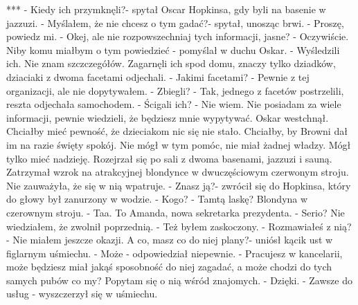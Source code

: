 \documentclass[12pt,a4paper]{book}
\begin{document}
                                       ***
- Kiedy ich przymknęli?- spytał Oscar Hopkinsa, gdy byli na basenie w jazzuzi. 
- Myślałem, że nie chcesz o tym gadać?- spytał, unosząc brwi.
- Proszę, powiedz mi. 
- Okej, ale nie rozpowszechniaj tych informacji, jasne?
- Oczywiście. 
Niby komu miałbym o tym powiedzieć - pomyślał w duchu Oskar.
- Wyśledzili ich. Nie znam szczczegółów. Zagarnęli ich spod domu, znaczy tylko dziadków, dziaciaki z dwoma facetami odjechali.
- Jakimi facetami?
- Pewnie z tej organizacji, ale nie dopytywałem. 
- Zbiegli?
- Tak, jednego z facetów postrzelili, reszta odjechała samochodem. 
- Ścigali ich?
- Nie wiem. Nie posiadam za wiele informacji, pewnie wiedzieli, że będziesz mnie wypytywać. 
Oskar westchnął. Chciałby mieć pewność, że dzieciakom nic się nie stało. Chciałby, by Browni dał im na razie święty spokój. Nie mógł w tym pomóc, nie miał żadnej władzy. Mógł tylko mieć nadzieję. 
Rozejrzał się po sali z dwoma basenami, jazzuzi i sauną. Zatrzymał wzrok na atrakcyjnej blondynce w dwuczęściowym czerwonym stroju. Nie zauważyła, że się w nią wpatruje. 
- Znasz ją?- zwrócił się do Hopkinsa, który do głowy był zanurzony w wodzie. 
- Kogo?
- Tamtą laskę? Blondyna w czerownym stroju. 
- Taa. To Amanda, nowa sekretarka prezydenta.
- Serio? Nie wiedziałem, że zwolnił poprzednią. 
- Też byłem zaskoczony. 
- Rozmawiałeś z nią? 
- Nie miałem jeszcze okazji. A co, masz co do niej plany?- uniósł kącik ust w figlarnym uśmiechu. 
- Może - odpowiedział niepewnie. 
- Pracujesz w kancelarii, może będziesz miał jakąś sposobność do niej zagadać, a może chodzi do tych samych pubów co my? Popytam się o nią wśród znajomych. 
- Dzięki. 
- Zawsze do usług - wyszczerzył się w uśmiechu.
\end{document}
